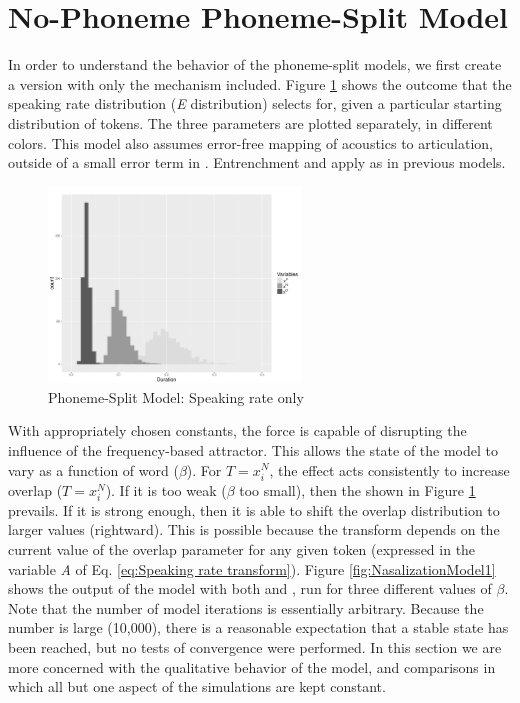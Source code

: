 \section{\label{sec:No-Phoneme-Phoneme-Split-Model}No-Phoneme Phoneme-Split Model}

In order to understand the behavior of the phoneme-split models, we
first create a version with only the  mechanism included.
Figure \ref{fig:SpeakingRateOnly} shows the outcome that the speaking
rate distribution (\emph{E} distribution) selects for, given a particular
starting distribution of tokens. The three  parameters
are plotted separately, in different colors. This model also assumes
error-free mapping of acoustics to articulation, outside of a small
error term in . Entrenchment and  apply as in
previous models.

\begin{figure}[h]
\includegraphics[width=0.6\textwidth]{figures/SpeakingRateI10000.pdf}\caption{\label{fig:SpeakingRateOnly}Phoneme-Split Model: Speaking rate only}
\end{figure}

With appropriately chosen constants, the  force is capable
of disrupting the influence of the frequency-based attractor. This
allows the  state of the model to vary as a function of
word  ($\beta$). For $T=x_{i}^{N}$, the  effect
acts consistently to increase  overlap ($T=x_{i}^{N}$). If
it is too weak ($\beta$ too small), then the  
shown in Figure \ref{fig:SpeakingRateOnly} prevails. If it is strong
enough, then it is able to shift the overlap distribution to larger
values (rightward). This is possible because the  transform
depends on the current value of the overlap parameter for any given
token (expressed in the variable \emph{A} of Eq. \ref{eq:Speaking rate transform}).
Figure \ref{fig:NasalizationModel1} shows the output of the model
with both  and  , run for three different
values of $\beta$. Note that the number of model iterations is essentially
arbitrary. Because the number is large (10,000), there is a reasonable
expectation that a stable state has been reached, but no tests of
convergence were performed. In this section we are more concerned
with the qualitative behavior of the model, and comparisons in which
all but one aspect of the simulations are kept constant.

